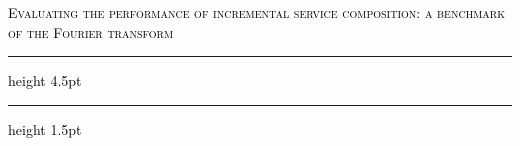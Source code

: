 \begin{center}
\chaptitlefont %
\begin{center}\textcolor{black}{\textsc{Evaluating the performance of incremental service composition: a benchmark of the Fourier transform}}
\end{center}
\end{center}
\vspace{8mm}
\textcolor{black}{\hrule height 4.5pt}%
\vspace{1mm}
\textcolor{black}{\hrule height 1.5pt}